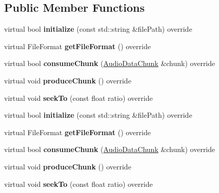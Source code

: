\subsection*{Public Member Functions}
\begin{DoxyCompactItemize}
\item 
\mbox{\label{classexperimental_1_1WAVReader_abfa18635e3d6edbd7def419dd1032e4c}} 
virtual bool {\bfseries initialize} (const std\+::string \&file\+Path) override
\item 
\mbox{\label{classexperimental_1_1WAVReader_a779f19a4455f06298d5243069d41f0bd}} 
virtual File\+Format {\bfseries get\+File\+Format} () override
\item 
\mbox{\label{classexperimental_1_1WAVReader_a0527ef0900491459573d32404f252e62}} 
virtual bool {\bfseries consume\+Chunk} (\hyperlink{structexperimental_1_1AudioDataChunk}{Audio\+Data\+Chunk} \&chunk) override
\item 
\mbox{\label{classexperimental_1_1WAVReader_a7f45e7007168118df4e4c88b3c3fc35f}} 
virtual void {\bfseries produce\+Chunk} () override
\item 
\mbox{\label{classexperimental_1_1WAVReader_a30bd4f8fffec467c8d285930ccb19f4d}} 
virtual void {\bfseries seek\+To} (const float ratio) override
\item 
\mbox{\label{classexperimental_1_1WAVReader_abfa18635e3d6edbd7def419dd1032e4c}} 
virtual bool {\bfseries initialize} (const std\+::string \&file\+Path) override
\item 
\mbox{\label{classexperimental_1_1WAVReader_a779f19a4455f06298d5243069d41f0bd}} 
virtual File\+Format {\bfseries get\+File\+Format} () override
\item 
\mbox{\label{classexperimental_1_1WAVReader_a0527ef0900491459573d32404f252e62}} 
virtual bool {\bfseries consume\+Chunk} (\hyperlink{structexperimental_1_1AudioDataChunk}{Audio\+Data\+Chunk} \&chunk) override
\item 
\mbox{\label{classexperimental_1_1WAVReader_a7f45e7007168118df4e4c88b3c3fc35f}} 
virtual void {\bfseries produce\+Chunk} () override
\item 
\mbox{\label{classexperimental_1_1WAVReader_a30bd4f8fffec467c8d285930ccb19f4d}} 
virtual void {\bfseries seek\+To} (const float ratio) override
\end{DoxyCompactItemize}
